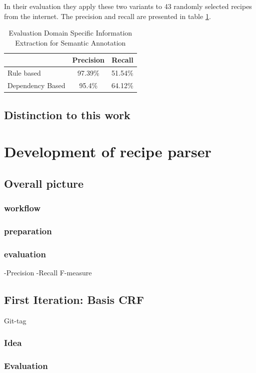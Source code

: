 \documentclass[12pt, twoside]{report}
\begin{document}
In their evaluation they apply these two variants to 43 randomly selected recipes from the internet. The precision and recall are presented in table \ref{tab:masterEval}.

\begin{table}[H]
	\centering
	\begin{tabular}{ l | c | r } 
		& Precision & Recall \\
		\hline
		Rule based & 97.39\% & 51.54\% \\
		Dependency Based & 95.4\% & 64.12\% \\
	\end{tabular}
	\caption{Evaluation Domain Specific Information Extraction for Semantic Annotation}
	\label{tab:masterEval}
\end{table}

\section{Distinction to this work}



\chapter{Development of recipe parser}

\section{Overall picture}
\subsection{workflow}
\subsection{preparation}
\subsection{evaluation}
-Precision -Recall F-measure

\section{First Iteration: Basis CRF}
Git-tag
\subsection{Idea}
\subsection{Evaluation}
\end{document}
